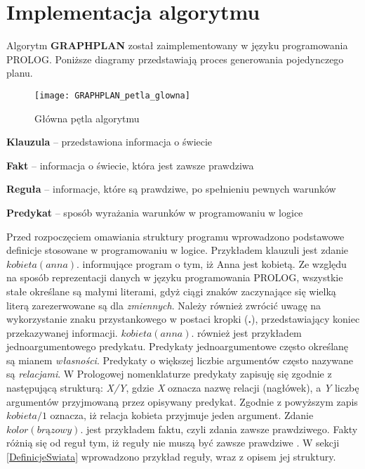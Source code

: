 \section{Implementacja algorytmu}
    Algorytm \textbf{GRAPHPLAN} został zaimplementowany w języku programowania PROLOG. Poniższe diagramy przedstawiają proces  
    generowania pojedynczego planu.
    \begin{figure}[H]
        \label{PetlaGlowna}
        \texttt{[image: GRAPHPLAN\_petla\_glowna]}
        \centering
        \caption{Główna pętla algorytmu}
    \end{figure}

    \begin{definition}
        \label{Predykat}
        \textbf{Klauzula} -- przedstawiona informacja o świecie
    \end{definition}

    \begin{definition}
        \label{Fakt}
        \textbf{Fakt} -- informacja o świecie, która jest zawsze prawdziwa
    \end{definition}

    \begin{definition}
        \label{Regula}
        \textbf{Reguła} -- informacje, które są prawdziwe, po spełnieniu pewnych warunków
    \end{definition}

    \begin{definition}
        \label{Predykat}
        \textbf{Predykat} -- sposób wyrażania warunków w programowaniu w logice
    \end{definition}


    Przed rozpoczęciem omawiania struktury programu wprowadzono podstawowe definicje stosowane w programowaniu w logice. Przykładem klauzuli jest 
    zdanie $kobieta(anna).$ informujące program o tym, iż Anna jest kobietą. Ze względu na sposób reprezentacji danych w języku programowania PROLOG, 
    wszystkie stałe określane są małymi literami, gdyż ciągi znaków zaczynające się wielką literą zarezerwowane są dla \textit{zmiennych}. Należy 
    również zwrócić uwagę na wykorzystanie znaku przystankowego w postaci kropki (\textbf{.}), przedstawiający koniec przekazywanej informacji. 
    $kobieta(anna).$ również jest przykładem jednoargumentowego predykatu. Predykaty jednoargumentowe często określanę są mianem \textit{własności}.
    Predykaty o większej liczbie argumentów często nazywane są \textit{relacjami}. W Prologowej nomenklaturze predykaty zapisuję się zgodnie 
    z następującą strukturą: \textit{X/Y}, gdzie \textit{X} oznacza nazwę relacji (nagłówek), a \textit{Y} liczbę argumentów przyjmowaną przez 
    opisywany predykat. Zgodnie z powyższym zapis $kobieta/1$ oznacza, iż relacja kobieta przyjmuje jeden argument.
    Zdanie $kolor(brązowy).$ jest przykładem faktu, czyli zdania zawsze prawdziwego. Fakty różnią się od reguł tym, iż reguły nie muszą być zawsze prawdziwe \cite{PROLOG}.
    W sekcji \ref{DefinicjeSwiata} wprowadzono przykład reguły, wraz z opisem jej struktury.

